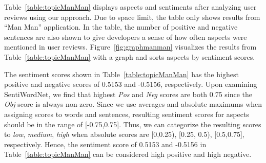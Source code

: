 Table~\ref{table:topicManMan} displays aspects and sentiments after analyzing user reviews using our approach. Due to space limit, the table only shows results from \enquote{Man Man} application. In the table, the number of positive and negative sentences are also shown to give developers a sense of how often aspects were mentioned in user reviews. Figure~\ref{fig:graphmanman} visualizes the results from Table~\ref{table:topicManMan} with a graph and sorts aspects by sentiment scores. 

The sentiment scores shown in Table~\ref{table:topicManMan} has the highest positive and negative scores of 0.5153 and -0.5156, respectively. Upon examining SentiWordNet, we find that highest \textit{Pos} and \textit{Neg} scores are both 0.75 since the \textit{Obj} score is always non-zero. Since we use averages and absolute maximums when assigning scores to words and sentences, resulting sentiment scores for aspects should be in the range of [-0.75,0.75]. Thus, we can categorize the resulting scores to \textit{low}, \textit{medium}, \textit{high} when absolute scores are [0,0.25), [0.25, 0.5), [0.5,0.75], respectively. Hence, the sentiment score of 0.5153 and -0.5156 in Table~\ref{table:topicManMan} can be considered high positive and high negative. 

